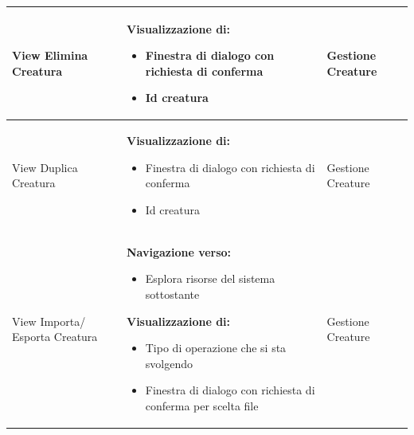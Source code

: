 \documentclass[a4paper, 11pt]{article}
\begin{document}
\begin{adjustwidth}{-1.5cm}{-1.5cm}
\begin{center}
\begin{longtable}{|p{5cm}|p{5cm}|p{5cm}|}
        View Elimina Creatura & \textbf{Visualizzazione di:}
        \begin{itemize}
            \item Finestra di dialogo con richiesta di conferma
            \item Id creatura
        \end{itemize} & Gestione Creature \\ \hline
        
        View Duplica Creatura & \textbf{Visualizzazione di:}
        \begin{itemize}
            \item Finestra di dialogo con richiesta di conferma
            \item Id creatura
        \end{itemize} & Gestione Creature \\ \hline
        
        View Importa/ Esporta Creatura & \textbf{Navigazione verso:}
        \begin{itemize}
            \item Esplora risorse del sistema sottostante
        \end{itemize}
        \textbf{Visualizzazione di:}
        \begin{itemize}
            \item Tipo di operazione che si sta svolgendo
            \item Finestra di dialogo con richiesta di conferma per scelta file
        \end{itemize} & Gestione Creature \\ \hline
        

\end{longtable}
\end{center}
\end{adjustwidth}
\end{document}
